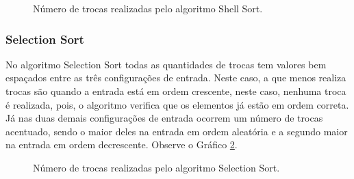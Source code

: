 \documentclass[conference,onecolumn]{IEEEtran}
\begin{document}
\begin{figure}[H]
\begin{center}
\end{center}
\caption{Número de trocas realizadas pelo algoritmo Shell Sort.}
\label{graf:shell-troca}
\end{figure}

\subsubsection{Selection Sort}

No algoritmo Selection Sort todas as quantidades de trocas tem valores bem espaçados entre as três configurações de entrada. Neste caso, a que menos realiza trocas são quando a entrada está em ordem crescente, neste caso, nenhuma troca é realizada, pois, o algoritmo verifica que os elementos já estão em ordem correta. Já nas duas demais configurações de entrada ocorrem um número de trocas acentuado, sendo o maior deles na entrada em ordem aleatória e a segundo maior na entrada em ordem decrescente. Observe o Gráfico \ref{graf:selection-troca}.

\begin{figure}[H]
\begin{center}
\end{center}
\caption{Número de trocas realizadas pelo algoritmo Selection Sort.}
\label{graf:selection-troca}
\end{figure}
\end{document}
